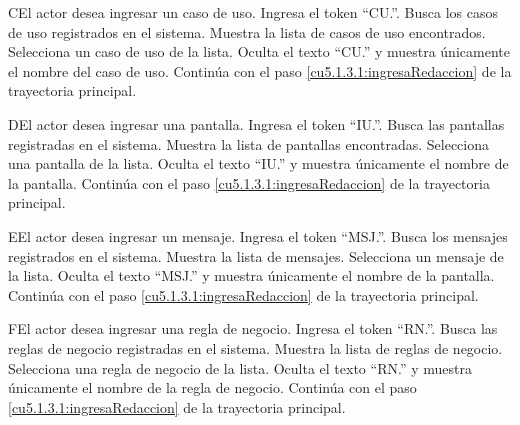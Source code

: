  \begin{UCtrayectoriaA}{C}{El actor desea ingresar un caso de uso.}
  	\UCpaso[\UCactor] Ingresa el token ``CU.''.	
 	\UCpaso[\UCsist] Busca los casos de uso registrados en el sistema. 
 	\UCpaso[\UCsist] Muestra la lista de casos de uso encontrados.
 	\UCpaso[\UCactor] Selecciona un caso de uso de la lista.
  	\UCpaso[\UCsist] Oculta el texto ``CU.'' y muestra únicamente el nombre del caso de uso.
    \UCpaso[] Continúa con el paso \ref{cu5.1.3.1:ingresaRedaccion} de la trayectoria principal.
 \end{UCtrayectoriaA}

 \begin{UCtrayectoriaA}{D}{El actor desea ingresar una pantalla.}
 	\UCpaso[\UCactor] Ingresa el token ``IU.''.	
 	\UCpaso[\UCsist] Busca las pantallas registradas en el sistema. 
 	\UCpaso[\UCsist] Muestra la lista de pantallas encontradas.
 	\UCpaso[\UCactor] Selecciona una pantalla de la lista.
  	\UCpaso[\UCsist] Oculta el texto ``IU.'' y muestra únicamente el nombre de la pantalla.
    \UCpaso[] Continúa con el paso \ref{cu5.1.3.1:ingresaRedaccion} de la trayectoria principal.
 \end{UCtrayectoriaA}

 \begin{UCtrayectoriaA}{E}{El actor desea ingresar un mensaje.}
 	 \UCpaso[\UCactor] Ingresa el token ``MSJ.''.	
 	\UCpaso[\UCsist] Busca los mensajes registrados en el sistema. 
 	\UCpaso[\UCsist] Muestra la lista de mensajes.
 	\UCpaso[\UCactor] Selecciona un mensaje de la lista.
  	\UCpaso[\UCsist] Oculta el texto ``MSJ.'' y muestra únicamente el nombre de la pantalla.
    \UCpaso[] Continúa con el paso \ref{cu5.1.3.1:ingresaRedaccion} de la trayectoria principal.
 \end{UCtrayectoriaA}

 \begin{UCtrayectoriaA}{F}{El actor desea ingresar una regla de negocio.}
 	\UCpaso[\UCactor] Ingresa el token ``RN.''.	
 	\UCpaso[\UCsist] Busca las reglas de negocio registradas en el sistema. 
 	\UCpaso[\UCsist] Muestra la lista de reglas de negocio.
 	\UCpaso[\UCactor] Selecciona una regla de negocio de la lista.
  	\UCpaso[\UCsist] Oculta el texto ``RN.'' y muestra únicamente el nombre de la regla de negocio.
    \UCpaso[] Continúa con el paso \ref{cu5.1.3.1:ingresaRedaccion} de la trayectoria principal.
 \end{UCtrayectoriaA}

